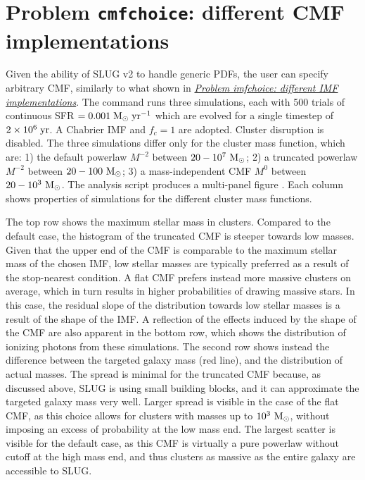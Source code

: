 \documentclass[letterpaper,10pt,english]{sphinxmanual}
\begin{document}
\section{Problem \texttt{cmfchoice}: different CMF implementations}
\label{tests:problem-cmfchoice-different-cmf-implementations}
Given the ability of SLUG v2 to handle generic PDFs, the user can specify arbitrary CMF,
similarly to what shown in  {\hyperref[tests:probimf\string-label]{\emph{Problem imfchoice: different IMF implementations}}}.
The command   runs three  simulations, each with 500 trials
of continuous  SFR \(=0.001\rm\;M_\odot\;yr^{-1}\) which are evolved for a
single timestep of  \(2\times 10^6\rm\;yr\). A Chabrier IMF and \(f_c=1\)
are adopted. Cluster disruption is disabled. The three simulations
differ only for the cluster mass function, which are:
1) the default powerlaw \(M^{-2}\) between \(20-10^{7}~\rm M_\odot\);
2) a truncated powerlaw \(M^{-2}\) between \(20-100~\rm M_\odot\);
3) a mass-independent CMF \(M^{0}\) between \(20-10^3~\rm M_\odot\).
The analysis script  produces a multi-panel figure
. Each column shows properties of simulations for the different
cluster mass functions.

The top row shows the maximum stellar mass in clusters. Compared to the default case,
the histogram of the truncated CMF is steeper towards low masses. Given that the upper end of the
CMF is comparable to the maximum stellar mass of the chosen IMF, low stellar masses are typically
preferred  as a result of the stop-nearest condition. A flat CMF
prefers instead more massive clusters on average, which in turn results in higher probabilities
of drawing massive stars. In this case, the residual slope of the distribution towards
low stellar masses is a result of the shape of the IMF. A reflection of the effects induced by the
shape of the CMF are also apparent in the bottom row, which shows the distribution of
ionizing photons from these simulations. The second row shows instead the difference
between the targeted galaxy mass (red line), and the distribution of actual masses.
The spread is minimal for the truncated CMF because, as discussed above, SLUG is using
small building blocks, and it can approximate the targeted galaxy mass very well.
Larger spread is visible in the case of the flat CMF, as this choice allows for clusters with masses
up to \(10^3~\rm M_\odot\), without imposing an excess of probability at the low
mass end. The largest scatter is visible for the default case, as this CMF is virtually
a pure powerlaw without cutoff at the high mass end, and thus clusters as massive as the entire galaxy
are accessible to SLUG.
\end{document}
